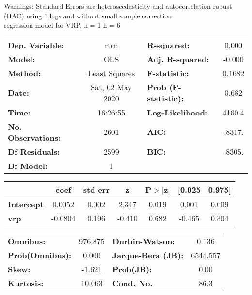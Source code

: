 Warnings: \newline
 [1] Standard Errors are heteroscedasticity and autocorrelation robust (HAC) using 1 lags and without small sample correction\\ 

regression model for VRP, k = 1 h = 6\begin{center}
\begin{tabular}{lclc}
\toprule
\textbf{Dep. Variable:}    &       rtrn       & \textbf{  R-squared:         } &     0.000   \\
\textbf{Model:}            &       OLS        & \textbf{  Adj. R-squared:    } &    -0.000   \\
\textbf{Method:}           &  Least Squares   & \textbf{  F-statistic:       } &    0.1682   \\
\textbf{Date:}             & Sat, 02 May 2020 & \textbf{  Prob (F-statistic):} &    0.682    \\
\textbf{Time:}             &     16:26:55     & \textbf{  Log-Likelihood:    } &    4160.4   \\
\textbf{No. Observations:} &        2601      & \textbf{  AIC:               } &    -8317.   \\
\textbf{Df Residuals:}     &        2599      & \textbf{  BIC:               } &    -8305.   \\
\textbf{Df Model:}         &           1      & \textbf{                     } &             \\
\bottomrule
\end{tabular}
\begin{tabular}{lcccccc}
                   & \textbf{coef} & \textbf{std err} & \textbf{z} & \textbf{P$> |$z$|$} & \textbf{[0.025} & \textbf{0.975]}  \\
\midrule
\textbf{Intercept} &       0.0052  &        0.002     &     2.347  &         0.019        &        0.001    &        0.009     \\
\textbf{vrp}       &      -0.0804  &        0.196     &    -0.410  &         0.682        &       -0.465    &        0.304     \\
\bottomrule
\end{tabular}
\begin{tabular}{lclc}
\textbf{Omnibus:}       & 976.875 & \textbf{  Durbin-Watson:     } &    0.136  \\
\textbf{Prob(Omnibus):} &   0.000 & \textbf{  Jarque-Bera (JB):  } & 6544.557  \\
\textbf{Skew:}          &  -1.621 & \textbf{  Prob(JB):          } &     0.00  \\
\textbf{Kurtosis:}      &  10.063 & \textbf{  Cond. No.          } &     86.3  \\
\bottomrule
\end{tabular}
\end{center}

